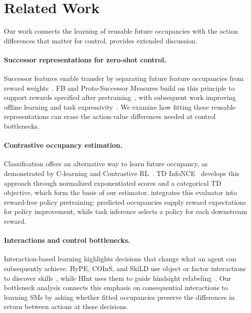 \section{Related Work}
\label{sec:related}

Our work connects the learning of reusable future occupancies with the action differences that matter for control.  provides extended discussion.

\paragraph{Successor representations for zero-shot control.}
Successor features enable transfer by separating future feature occupancies from reward weights~\citep{dayan-nc93a,barreto-neurips17}.
FB and Proto-Successor Measures build on this principle to support rewards specified after pretraining~\citep{touati-neurips21a,touati-iclr23b,agarwal-icml25a}, with subsequent work improving offline learning and task expressivity~\citep{jeen-neurips24a,cetin-rlj24a}. We examine how fitting these reusable representations can erase the action-value differences needed at control bottlenecks.

\paragraph{Contrastive occupancy estimation.}
Classification offers an alternative way to learn future occupancy, as demonstrated by C-learning and Contrastive RL~\citep{eysenbach-iclr21a,eysenbach-neurips22a}.
TD InfoNCE~\citep{zheng-iclr24a} develops this approach through normalized exponentiated scores and a categorical TD objective, which form the basis of our estimator.
\name{} integrates this evaluator into reward-free policy pretraining: predicted occupancies supply reward expectations for policy improvement, while task inference selects a policy for each downstream reward.

\paragraph{Interactions and control bottlenecks.}
Interaction-based learning highlights decisions that change what an agent can subsequently achieve. HyPE, COInS, and SkiLD use object or factor interactions to discover skills~\citep{chuck2020hypothesis,chuck2024granger,wang2024skild}, while HInt uses them to guide hindsight relabeling~\citep{chuck2025null}. Our bottleneck analysis connects this emphasis on consequential
interactions to learning SMs by asking whether fitted occupancies preserve the differences in return between actions at these decisions.
